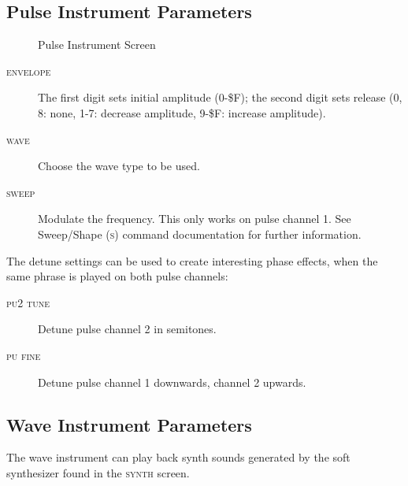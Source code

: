 \subsection{Pulse Instrument Parameters}

\begin{figure}[htpb]
	\begin{center}
	\end{center}
	\caption{Pulse Instrument Screen}
	\label{fig:instr-pulse}
\end{figure}

\begin{description}
	\item[\textsc{envelope}] The first digit sets initial amplitude (0-\$F); the second digit sets release (0, 8: none, 1-7: decrease amplitude, 9-\$F: increase amplitude).
	\item[\textsc{wave}] Choose the wave type to be used.
	\item[\textsc{sweep}] Modulate the frequency. This only works on pulse channel 1. See Sweep/Shape (\textsc{s}) command documentation for further information.
\end{description}

\label{detune}
The detune settings can be used to create interesting phase effects, when the same phrase is played on both pulse channels:

\begin{description}
	\item[\textsc{pu2 tune}] Detune pulse channel 2 in semitones.
	\item[\textsc{pu fine}] Detune pulse channel 1 downwards, channel 2 upwards.
\end{description}

\subsection{Wave Instrument Parameters}

The wave instrument can play back synth sounds generated by the soft synthesizer found in the \textsc{synth} screen.

\begin{figure}[hbtp]
	\begin{center}
	\end{center}
\end{figure}

